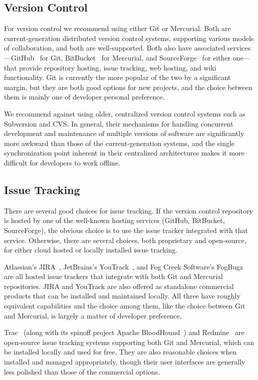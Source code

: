 \subsection{Version Control}

For version control we recommend using either Git or Mercurial. Both
are current-generation distributed version control systems, supporting
various models of collaboration, and both are well-supported. Both
also have associated services---GitHub~\cite{GitHub} for Git,
BitBucket~\cite{BitBucket} for Mercurial, and
SourceForge~\cite{SourceForge} for either one---that provide
repository hosting, issue tracking, web hosting, and wiki
functionality. Git is currently the more popular of the two by a
significant margin, but they are both good options for new projects,
and the choice between them is mainly one of developer personal
preference.

We recommend against using older, centralized version control systems
such as Subversion and CVS. In general, their mechanisms for handling
concurrent development and maintenance of multiple versions of
software are significantly more awkward than those of the
current-generation systems, and the single synchronization point
inherent in their centralized architectures makes it more difficult
for developers to work offline.

\subsection{Issue Tracking}

There are several good choices for issue tracking. If the version
control repository is hosted by one of the well-known hosting services
(GitHub, BitBucket, SourceForge), the obvious choice is to use the
issue tracker integrated with that service. Otherwise, there are
several choices, both proprietary and open-source, for either cloud
hosted or locally installed issue tracking.

Atlassian's JIRA~\cite{JIRA}, JetBrains's YouTrack~\cite{YouTrack},
and Fog Creek Software's FogBugz~\cite{FogBugz} are all hosted issue
trackers that integrate with both Git and Mercurial repositories. JIRA
and YouTrack are also offered as standalone commercial products that
can be installed and maintained locally. All three have roughly
equivalent capabilities and the choice among them, like the choice
between Git and Mercurial, is largely a matter of developer
preference.

Trac~\cite{Trac} (along with its spinoff project Apache
BloodHound~\cite{ApacheBloodhound}) and Redmine~\cite{Redmine} are
open-source issue tracking systems supporting both Git and Mercurial,
which can be installed locally and used for free. They are also
reasonable choices when installed and managed appropriately, though
their user interfaces are generally less polished than those of the
commercial options.

